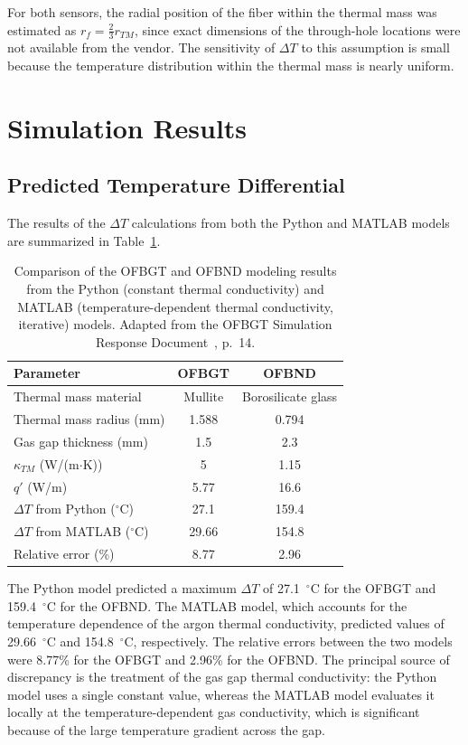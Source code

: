 For both sensors, the radial position of the fiber within the thermal mass was estimated as $r_f = \frac{2}{3}r_{TM}$, since exact dimensions of the through-hole locations were not available from the vendor.  The sensitivity of $\Delta T$ to this assumption is small because the temperature distribution within the thermal mass is nearly uniform.

\section{Simulation Results}
\label{sec:simulation_results}

\subsection{Predicted Temperature Differential}

The results of the $\Delta T$ calculations from both the Python and MATLAB models are summarized in Table~\ref{tab:deltaT_results}.

\begin{table}[htbp]
\centering
\caption[Comparison of OFBGT and OFBND modeling results.]{Comparison of the OFBGT and OFBND modeling results from the Python (constant thermal conductivity) and MATLAB (temperature-dependent thermal conductivity, iterative) models.  Adapted from the OFBGT Simulation Response Document~\cite{SimReport2023}, p.~14.}
\label{tab:deltaT_results}
\begin{tabular}{l c c}
\hline
\textbf{Parameter} & \textbf{OFBGT} & \textbf{OFBND} \\
\hline
Thermal mass material & Mullite & Borosilicate glass \\
Thermal mass radius (mm) & 1.588 & 0.794 \\
Gas gap thickness (mm) & 1.5 & 2.3 \\
$\kappa_{TM}$ (W/(m$\cdot$K)) & 5 & 1.15 \\
$q'$ (W/m) & 5.77 & 16.6 \\
$\Delta T$ from Python ($^\circ$C) & 27.1 & 159.4 \\
$\Delta T$ from MATLAB ($^\circ$C) & 29.66 & 154.8 \\
Relative error (\%) & 8.77 & 2.96 \\
\hline
\end{tabular}
\end{table}

The Python model predicted a maximum $\Delta T$ of 27.1~$^\circ$C for the OFBGT and 159.4~$^\circ$C for the OFBND.  The MATLAB model, which accounts for the temperature dependence of the argon thermal conductivity, predicted values of 29.66~$^\circ$C and 154.8~$^\circ$C, respectively.  The relative errors between the two models were 8.77\% for the OFBGT and 2.96\% for the OFBND.  The principal source of discrepancy is the treatment of the gas gap thermal conductivity: the Python model uses a single constant value, whereas the MATLAB model evaluates it locally at the temperature-dependent gas conductivity, which is significant because of the large temperature gradient across the gap.

